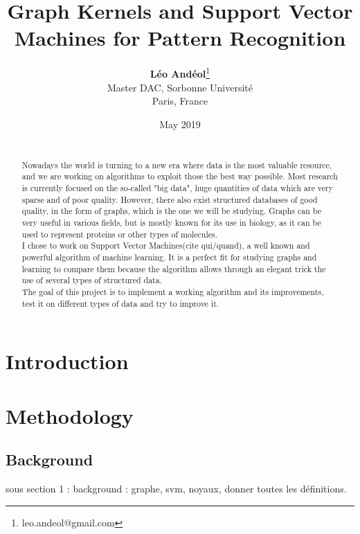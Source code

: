 \documentclass{article}
\title{Graph Kernels and Support Vector Machines for Pattern Recognition}
\author{\textbf{Léo Andéol}\thanks{leo.andeol@gmail.com}\\ Master DAC, Sorbonne Université\\ Paris, France}
\date{May 2019}
\theoremstyle{definition}
\begin{document}
\maketitle
\begin{abstract}
	\\
	Nowadays the world is turning to a new era where data is the most valuable resource, and we are working on algorithms to exploit those the best way possible. Most research is currently focused on the so-called "big data", huge quantities of data which are very sparse and of poor quality. However, there also exist structured databases of good quality, in the form of graphs, which is the one we will be studying. Graphs can be very useful in various fields, but is mostly known for its use in biology, as it can be used to represent proteins or other types of molecules.\\
	I chose to work on Support Vector Machines(cite qui/quand), a well known and powerful algorithm of machine learning. It is a perfect fit for studying graphs and learning to compare them because the algorithm allows through an elegant trick the use of several types of structured data.\\
	The goal of this project is to implement a working algorithm and its improvements, test it on different types of data and try to improve it.
\end{abstract}

\newpage

\tableofcontents

\newpage

\section{Introduction}
 \lipsum[1-8]
\section{Methodology}
\subsection{Background}
sous section 1 : background : graphe, svm, noyaux, donner toutes les définitions.
\end{document}
